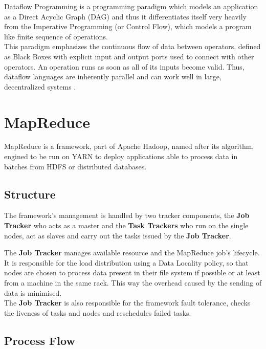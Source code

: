 Dataflow Programming is a programming paradigm which models an application as a Direct Acyclic Graph (DAG) and thus it differentiates itself very heavily from the Imperative Programming (or Control Flow), which models a program like finite sequence of operations.\\
This paradigm emphasizes the continuous flow of data between operators, defined as Black Boxes with explicit input and output ports used to connect with other operators. An operation runs as soon as all of its inputs become valid. Thus, dataflow languages are inherently parallel and can work well in large, decentralized systems \cite{Johnston:2004:ADP:1013208.1013209}.

\pagebreak

\section{MapReduce} \label{MapReduce}

MapReduce is a framework, part of Apache Hadoop, named after its algorithm, engined to be run on YARN to deploy applications able to process data in batches from HDFS or distributed databases. \\

\subsection{Structure}
The framework's management is handled by two tracker components, the \textbf{Job Tracker} who acts as a master and the \textbf{Task Trackers} who run on the single nodes, act as slaves and carry out the tasks issued by the \textbf{Job Tracker}.

The \textbf{Job Tracker} manages available resource and the MapReduce job's lifecycle.\\ It is responsible for the load distribution using a Data Locality policy, so that nodes are chosen to process data present in their file system if possible or at least from a machine in the same rack. This way the overhead caused by the sending of data is minimised.
\\
The \textbf{Job Tracker} is also responsible for the framework fault tolerance, checks the liveness of tasks and nodes and reschedules failed tasks.

\subsection{Process Flow}

